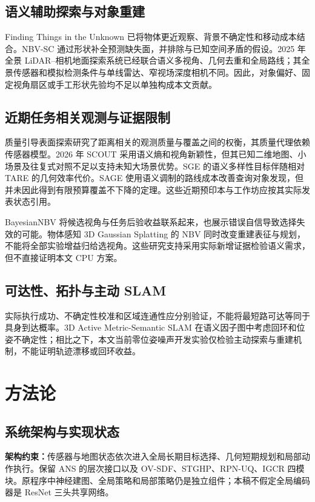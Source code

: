 \documentclass[11pt,a4paper]{article}
\begin{document}
\subsection{语义辅助探索与对象重建}
Finding Things in the Unknown 已将物体更近观察、背景不确定性和移动成本结合\cite{papatheodorou2023finding}。NBV-SC 通过形状补全预测缺失面，并排除与已知空间矛盾的假设\cite{menon2023nbvsc}。2025 年全景 LiDAR--相机地面探索系统已经联合语义多视角、几何去重和全局路线；其全景传感器和模拟检测条件与单线雷达、窄视场深度相机不同\cite{zhan2025panoramic}。因此，对象偏好、固定视角扇区或手工形状先验均不足以单独构成本文贡献。

\subsection{近期任务相关观测与证据限制}
质量引导表面探索研究了距离相关的观测质量与覆盖之间的权衡，其质量代理依赖传感器模型\cite{sportich2025quality}。2026 年 SCOUT 采用语义熵和视角新颖性，但其已知二维地图、小场景及往复式对照不足以支持未知大场景优势\cite{mao2026scout}。SGE 的语义多样性目标伴随相对 TARE 的几何效率代价\cite{tatsch2026sge}。SAGE 使用语义调制的路线成本改善查询对象发现，但并未因此得到有限预算覆盖不下降的定理\cite{vegesna2026sage}。这些近期预印本与工作坊应按其实际发表状态引用。

BayesianNBV 将候选视角与任务后验收益联系起来，也展示错误自信导致选择失效的可能\cite{zhu2026bayesiannbv}。物体感知 3D Gaussian Splatting 的 NBV 同时改变重建表征与规划，不能将全部实验增益归给选视角\cite{jeong2026objectnbv}。这些研究支持采用实际新增证据检验语义需求，但不直接证明本文 CPU 方案。

\subsection{可达性、拓扑与主动 SLAM}
实际执行成功、不确定性校准和区域连通性应分别验证，不能将最短路可达等同于具身到达概率。3D Active Metric-Semantic SLAM 在语义因子图中考虑回环和位姿不确定性\cite{tao2024active}；相比之下，本文当前零位姿噪声开发实验仅检验主动探索与重建机制，不能证明轨迹漂移或回环收益。

\section{方法论}
\subsection{系统架构与实现状态}
\textbf{架构约束：}传感器与地图状态依次进入全局长期目标选择、几何短期规划和局部动作执行。保留 ANS 的层次接口以及 OV-SDF、STGHP、RPN-UQ、IGCR 四模块。原程序中神经建图、全局策略和局部策略仍是独立组件；本稿不假定全局编码器是 ResNet 三头共享网络。
\end{document}
